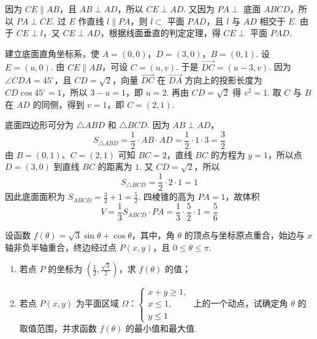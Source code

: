 \begin{solution}
因为 \(CE\parallel AB\)，且 \(AB\perp AD\)，所以 \(CE\perp AD\). 又因为 \(PA\perp\) 底面 \(ABCD\)，所以 \(PA\perp CE\). 过 \(E\) 作直线 \(l\parallel PA\)，则 \(l\subset\) 平面 \(PAD\)，且 \(l\) 与 \(AD\) 相交于 \(E\). 由于 \(CE\perp l\)，又 \(CE\perp AD\)，根据线面垂直的判定定理，得 \(CE\perp\) 平面 \(PAD\).

建立底面直角坐标系，使 \(A=(0,0)\)，\(D=(3,0)\)，\(B=(0,1)\). 设 \(E=(u,0)\). 由 \(CE\parallel AB\)，可设 \(C=(u,v)\). 于是 \(\overrightarrow{DC}=(u-3,v)\). 因为 \(\angle CDA=45^\circ\)，且 \(CD=\sqrt2\)，向量 \(\overrightarrow{DC}\) 在 \(\overrightarrow{DA}\) 方向上的投影长度为 \(CD\cos45^\circ=1\)，所以 \(3-u=1\)，即 \(u=2\). 再由 \(CD=\sqrt2\) 得 \(v^2=1\). 取 \(C\) 与 \(B\) 在 \(AD\) 的同侧，得到 \(v=1\)，即 \(C=(2,1)\).

底面四边形可分为 \(\triangle ABD\) 和 \(\triangle BCD\). 因为 \(AB\perp AD\)，
\[
S_{\triangle ABD}=\frac12\cdot AB\cdot AD=\frac12\cdot1\cdot3=\frac32
\]
由 \(B=(0,1)\)、\(C=(2,1)\) 可知 \(BC=2\)，直线 \(BC\) 的方程为 \(y=1\)，所以点 \(D=(3,0)\) 到直线 \(BC\) 的距离为 \(1\). 又 \(CD=\sqrt2\)，所以
\[
S_{\triangle BCD}=\frac12\cdot2\cdot1=1
\]
因此底面面积为 \(S_{ABCD}=\frac32+1=\frac52\). 四棱锥的高为 \(PA=1\)，故体积
\[
V=\frac13 S_{ABCD}\cdot PA=\frac13\cdot\frac52\cdot1=\frac56
\]
\end{solution}

\begin{problem}
设函数 \( f(\theta) = \sqrt{3}\sin \theta + \cos \theta \)，其中，角 \( \theta \) 的顶点与坐标原点重合，始边与 \( x \) 轴非负半轴重合，终边经过点 \( P(x, y) \)，且 \( 0 \leqslant \theta \leqslant \pi \).

\begin{enumerate}
\item 若点 \(P\) 的坐标为 \(\left(\frac{1}{2}, \frac{\sqrt{3}}{2}\right)\)，求 \(f(\theta)\) 的值；
\item 若点 \(P(x, y)\) 为平面区域 \(\Omega\)：\(\begin{cases}
x + y \geqslant 1,\\
x \leqslant 1,\\
y \leqslant 1
\end{cases}\) 上的一个动点，试确定角 \(\theta\) 的取值范围，并求函数 \(f(\theta)\) 的最小值和最大值.
\end{enumerate}
\end{problem}

